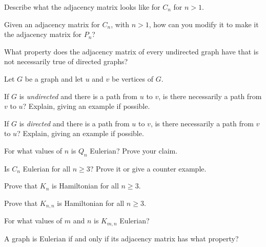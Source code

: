 \begin{pro}
Describe what the adjacency matrix looks like for $C_n$ for $n>1$.
\end{pro}

\begin{pro}
Given an adjacency matrix for $C_n$, with $n>1$, how can you modify it to make it the
adjacency matrix for $P_n$?
\end{pro}

\begin{pro}
What property does the adjacency matrix of every undirected graph have that 
is not necessarily true of directed graphs?
\end{pro}

\begin{pro}
Let $G$ be a graph and let $u$ and $v$ be vertices of $G$.
\begin{lenum}
\item
If $G$ is {\em undirected} and there is a path from $u$ to $v$, 
is there necessarily a path from $v$ to $u$?
Explain, giving an example if possible.
\item
If $G$ is {\em directed} and there is a path from $u$ to $v$, 
is there necessarily a path from $v$ to $u$?
Explain, giving an example if possible.
\end{lenum}
\end{pro}

\begin{pro}
For what values of $n$ is $Q_n$ Eulerian?  Prove your claim.
\end{pro}

\begin{pro}
Is $C_n$ Eulerian for all $n\geq 3$?  Prove it or give a counter example.
\end{pro}

\begin{pro}
Prove that $K_n$ is Hamiltonian for all $n\geq 3$.
\end{pro}

\begin{pro}
Prove that $K_{n,n}$ is Hamiltonian for all $n\geq 3$.
\end{pro}

\begin{pro}
For what values of $m$ and $n$ is $K_{m,n}$ Eulerian?
\end{pro}

\begin{pro}
A graph is Eulerian if and only if its adjacency matrix has what property?
\end{pro}

